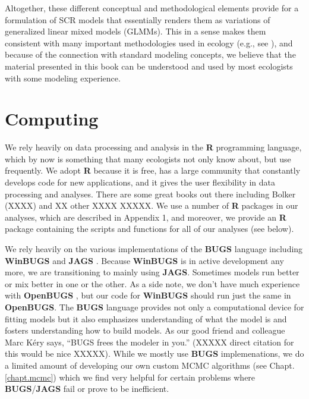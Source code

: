 \begin{itemize}
Altogether, these different conceptual and methodological elements
provide for a formulation of SCR models that essentially renders them
as variations of generalized linear mixed models (GLMMs). This in a
sense makes them consistent with many important methodologies used in
ecology (e.g., see \citet{zuur_etal:2009, kery_etal:2010}), and
because of the connection with standard modeling concepts, we believe
that the material presented in this book can be understood and used by
most ecologists with some modeling experience.


\section*{Computing}

We rely heavily on data processing and analysis in the {\bf R}
programming language, which by now is something that many
ecologists not only know about, but use frequently.  We
adopt {\bf R} because
it is free, has a large community that constantly develops
code for new applications, and it gives the user flexibility in data processing and analyses.
There are some great books out there including Bolker (XXXX) and XX
other XXXX XXXXX. We use a number of {\bf R} packages in our
analyses, which are described in Appendix 1, and moreover, we provide an
{\bf R} package containing the scripts and functions for all of our
analyses (see below).

We rely heavily on the various implementations of the {\bf BUGS}
language including {\bf WinBUGS} \citep{lunn_etal:2000} and {\bf JAGS}
\citep{plummer:2003}.  Because  {\bf WinBUGS} is in active development any more,
we are transitioning to mainly using {\bf
  JAGS}.  Sometimes models run better or mix
better in one or the other. As a side note, we don't have much experience with {\bf
  OpenBUGS} \citep{thomas_etal:2006}, but our code for {\bf WinBUGS} should run just
the same in {\bf OpenBUGS}. The {\bf BUGS}
language provides not only a computational device for fitting models but
it also emphasizes understanding of what the model is and
fosters understanding how to build models.   As our good friend and
colleague Marc K\'{e}ry says, ``BUGS frees the modeler in you.''
(XXXXX direct citation for this would be nice XXXXX).
While we mostly use {\bf BUGS} implemenations, we do a limited
amount of developing our own custom MCMC algorithms (see
Chapt. \ref{chapt.mcmc}) which we find very helpful for certain
problems where {\bf BUGS}/{\bf JAGS} fail or prove to be inefficient.



\end{itemize}
